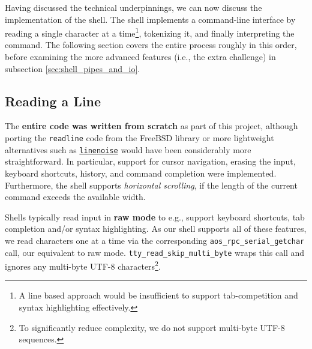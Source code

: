 Having discussed the technical underpinnings, we can now discuss the implementation of the shell. The shell implements a command-line interface by reading a single character at a time\footnote{A line based approach would be insufficient to support tab-competition and syntax highlighting effectively.}, tokenizing it, and finally interpreting the command. The following section covers the entire process roughly in this order, before examining the more advanced features (i.e., the extra challenge) in subsection \ref{sec:shell_pipes_and_io}. 

\subsection{Reading a Line}

The \textbf{entire code was written from scratch} as part of this project, although porting the \texttt{readline} code from the FreeBSD library or more lightweight alternatives such as \href{https://github.com/antirez/linenoise}{\texttt{linenoise}} would have been considerably more straightforward. In particular, support for cursor navigation, erasing the input, keyboard shortcuts, history, and command completion were implemented. Furthermore, the shell supports \emph{horizontal scrolling}, if the length of the current command exceeds the available width.

Shells typically read input in \textbf{raw mode} to e.g., support keyboard shortcuts, tab completion and/or syntax highlighting. As our shell supports all of these features, we read characters one at a time via the corresponding \texttt{aos\_rpc\_serial\_getchar} call, our equivalent to raw mode. \texttt{tty\_read\_skip\_multi\_byte} wraps this call and ignores any multi-byte UTF-8 characters\footnote{To significantly reduce complexity, we do not support multi-byte UTF-8 sequences.}.

